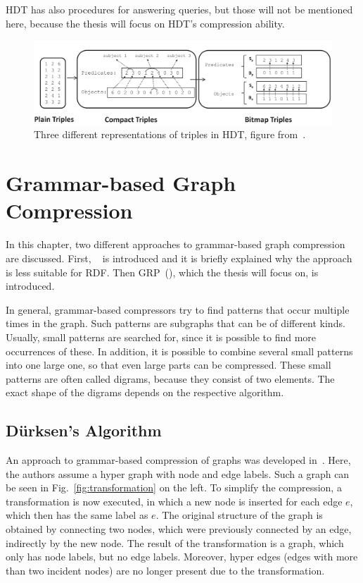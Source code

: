 HDT has also procedures for answering queries, but those will not be mentioned here, because the thesis will focus on HDT's compression ability.




\begin{figure}[h]
	\centering
	\includegraphics[width=1\textwidth]{figures/relatedwork/hdt1}
	\caption{Three different representations of triples in HDT, figure from~\cite{hdt}.}
	\label{fig:hdt_overview}
\end{figure}


\section{Grammar-based Graph Compression}\label{related_work_grammar_based}

In this chapter, two different approaches to grammar-based graph compression are discussed. First, ~\cite{mattdk} is introduced and it is briefly explained why the approach is less suitable for RDF. Then GRP~(\cite{maneth}), which the thesis will focus on, is introduced.

In general, grammar-based compressors try to find patterns that occur multiple times in the graph. Such patterns are subgraphs that can be of different kinds. Usually, small patterns are searched for, since it is possible to find more occurrences of these. In addition, it is possible to combine several small patterns into one large one, so that even large parts can be compressed. These small patterns are often called digrams, because they consist of two elements. The exact shape of the digrams depends on the respective algorithm.

\subsection{Dürksen's Algorithm}

An approach to grammar-based compression of graphs was developed in~\cite{mattdk}. Here, the authors assume a hyper graph with node and edge labels. Such a graph can be seen in Fig.~\ref{fig:transformation} on the left. To simplify the compression, a transformation is now executed, in which a new node is inserted for each edge $e$, which then has the same label as $e$. The original structure of the graph is obtained by connecting two nodes, which were previously connected by an edge, indirectly by the new node. The result of the transformation is a graph, which only has node labels, but no edge labels. Moreover, hyper edges (edges with more than two incident nodes) are no longer present due to the transformation.

